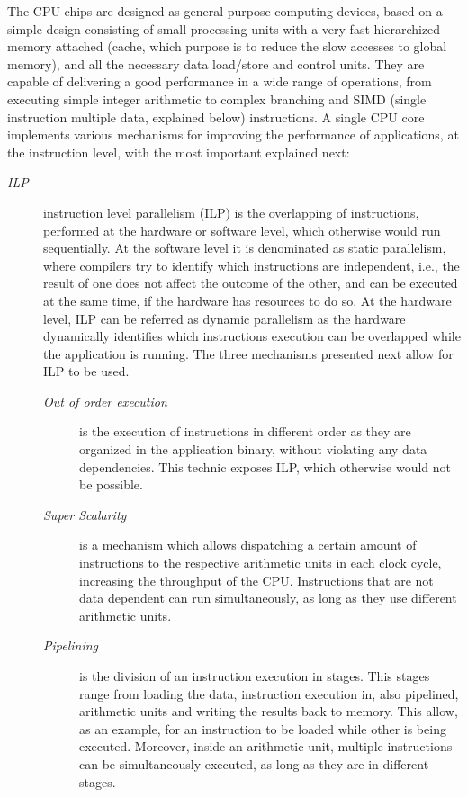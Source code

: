 The CPU chips are designed as general purpose computing devices, based on a simple design consisting of small processing units with a very fast hierarchized memory attached (cache, which purpose is to reduce the slow accesses to global memory), and all the necessary data load/store and control units. They are capable of delivering a good performance in a wide range of operations, from executing simple integer arithmetic to complex branching and SIMD (single instruction multiple data, explained below) instructions. A single CPU core implements various mechanisms for improving the performance of applications, at the instruction level, with the most important explained next:

\begin{description}
	\item[\textit{ILP}] instruction level parallelism (ILP) is the overlapping of instructions, performed at the hardware or software level, which otherwise would run sequentially. At the software level it is denominated as static parallelism, where compilers try to identify which instructions are independent, i.e., the result of one does not affect the outcome of the other, and can be executed at the same time, if the hardware has resources to do so. At the hardware level, ILP can be referred as dynamic parallelism as the hardware dynamically identifies which instructions execution can be overlapped while the application is running. The three mechanisms presented next allow for ILP to be used.
	\begin{description}
		\item[\textit{Out of order execution}] is the execution of instructions in different order as they are organized in the application binary, without violating any data dependencies. This technic exposes ILP, which otherwise would not be possible.
		\item[\textit{Super Scalarity}] is a mechanism which allows dispatching a certain amount of instructions to the respective arithmetic units in each clock cycle, increasing the throughput of the CPU. Instructions that are not data dependent can run simultaneously, as long as they use different arithmetic units.
		\item[\textit{Pipelining}] is the division of an instruction execution in stages. This stages range from loading the data, instruction execution in, also pipelined, arithmetic units and writing the results back to memory. This allow, as an example, for an instruction to be loaded while other is being executed. Moreover, inside an arithmetic unit, multiple instructions can be simultaneously executed, as long as they are in different stages.

\end{description}
\end{description}
